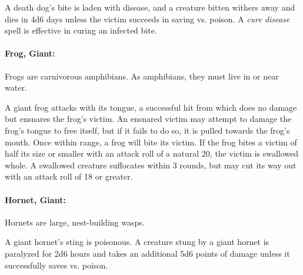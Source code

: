 \begin{multicols}{2}
A death dog's bite is laden with disease, and a creature bitten withers away and dies in 4d6 days unless the victim succeeds in saving vs. poison. A \textit{cure disease} spell is effective in curing an infected bite.

\paragraph{Frog, Giant:} Frogs are carnivorous amphibians. As amphibians, they must live in or near water.

A giant frog attacks with its tongue, a successful hit from which does no damage but ensnares the frog's victim. An ensnared victim may attempt to damage the frog's tongue to free itself, but if it fails to do so, it is pulled towards the frog's mouth. Once within range, a frog will bite its victim. If the frog bites a victim of half its size or smaller with an attack roll of a natural 20, the victim is swallowed whole. A swallowed creature suffocates within 3 rounds, but may cut its way out with an attack roll of 18 or greater. 

\paragraph{Hornet, Giant:} Hornets are large, nest-building wasps.

A giant hornet's sting is poisonous. A creature stung by a giant hornet is paralyzed for 2d6 hours and takes an additional 5d6 points of damage unless it successfully saves vs. poison.

\end{multicols}



